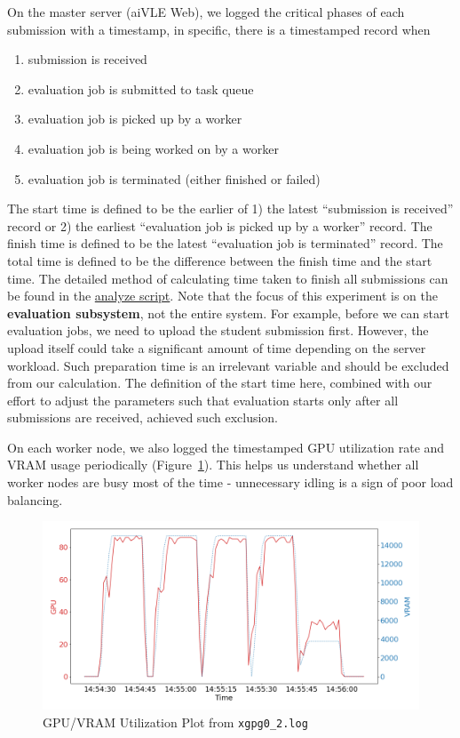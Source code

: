 On the master server (aiVLE Web), we logged the critical phases of each submission with a timestamp, in specific, there is a timestamped record when
\begin{enumerate}
    \item submission is received
    \item evaluation job is submitted to task queue
    \item evaluation job is picked up by a worker
    \item evaluation job is being worked on by a worker
    \item evaluation job is terminated (either finished or failed)
\end{enumerate}

The start time is defined to be the earlier of 1) the latest ``submission is received'' record or 2) the earliest ``evaluation job is picked up by a worker'' record. The finish time is defined to be the latest ``evaluation job is terminated'' record. The total time is defined to be the difference between the finish time and the start time. The detailed method of calculating time taken to finish all submissions can be found in the \href{https://github.com/edu-ai/aivle-experiment-logs/blob/main/web/analyze.ipynb}{analyze script}. Note that the focus of this experiment is on the \textbf{evaluation subsystem}, not the entire system. For example, before we can start evaluation jobs, we need to upload the student submission first. However, the upload itself could take a significant amount of time depending on the server workload. Such preparation time is an irrelevant variable and should be excluded from our calculation. The definition of the start time here, combined with our effort to adjust the parameters such that evaluation starts only after all submissions are received, achieved such exclusion.

On each worker node, we also logged the timestamped GPU utilization rate and VRAM usage periodically (Figure~\ref{fig:experiment-lb-utilization-plot}). This helps us understand whether all worker nodes are busy most of the time - unnecessary idling is a sign of poor load balancing.

\begin{figure}[H]
    \centering
    \includegraphics[width=\textwidth]{images/worker-utilization.png}
    \caption{GPU/VRAM Utilization Plot from \texttt{xgpg0\_2.log}}
    \label{fig:experiment-lb-utilization-plot}
\end{figure}

